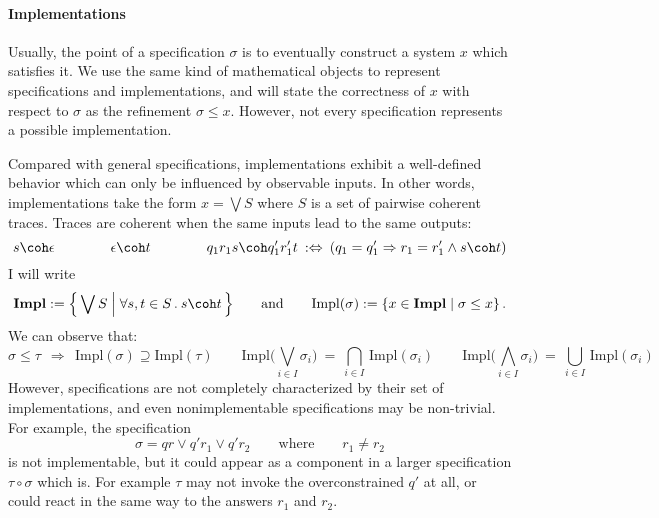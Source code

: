 \documentclass[11pt]{article}
\begin{document}
\paragraph{Implementations}

Usually,
the point of a specification $\sigma$ is to
eventually construct a system $x$ which satisfies it.
We use the same kind of mathematical objects
to represent specifications and implementations,
and will state the correctness of $x$ with respect to $\sigma$
as the refinement $\sigma \le x$.
However,
not every specification represents a possible implementation.

Compared with general specifications,
implementations exhibit a well-defined behavior
which can only be influenced by observable inputs.
In other words,
implementations take the form
$x = \bigvee S$
where $S$ is a set of pairwise coherent traces.
Traces are coherent when
the same inputs lead to the same outputs:
\[
  s \coh \epsilon \qquad\qquad
  \epsilon \coh t \qquad\qquad
  q_1 r_1 s \coh q_1' r_1' t
  \: :\Leftrightarrow \:
  (q_1 = q_1' \Rightarrow r_1 = r_1' \wedge s \coh t)
\]
I will write
\[
  \mathbf{Impl} := \Big\{ \bigvee S \mathrel\Big|
    \forall s, t \in S \mathbin. s \coh t  \, \Big\}
  \qquad \text{and} \qquad
  \mathrm{Impl}(\sigma) :=
    \{ x \in \mathbf{Impl} \mid \sigma \le x \}
  \,.
\]
We can observe that:
{\small \[
  \sigma \le \tau
  \:\:\Longrightarrow\:\:
  \mathrm{Impl}(\sigma) \supseteq
  \mathrm{Impl}(\tau)
\qquad
  \mathrm{Impl} \Big( \bigvee_{i \in I} \sigma_i \Big) \: = \:
  \bigcap_{i \in I} \, \mathrm{Impl}(\sigma_i)
\qquad
  \mathrm{Impl} \Big( \bigwedge_{i \in I} \sigma_i \Big) \: = \:
  \bigcup_{i \in I} \, \mathrm{Impl}(\sigma_i)
\]}%
However,
specifications are not completely characterized
by their set of implementations,
and even nonimplementable specifications
may be non-trivial.
For example, the specification
\[
  \sigma = q r \vee q' r_1 \vee q' r_2
  \qquad \text{where} \qquad
  r_1 \neq r_2
\]
is not implementable,
but it could appear as a component in a larger specification
$\tau \circ \sigma$ which is.
For example $\tau$ may not invoke the overconstrained $q'$ at all,
or could react in the same way to the answers $r_1$ and $r_2$.
\end{document}

